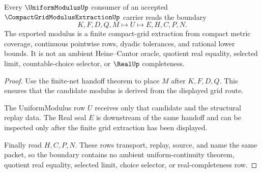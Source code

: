 \begin{theorem}
\label{thm:compact-grid-modulus-extraction-uniform-modulus-boundary}
Every $\UniformModulusUp$ consumer of an accepted $\CompactGridModulusExtractionUp$ carrier reads the boundary
$$
K,F,D,Q,M \longmapsto U \longmapsto E,H,C,P,N .
$$
The exported modulus is a finite compact-grid extraction from compact metric coverage, continuous pointwise rows, dyadic tolerances, and rational lower bounds. It is not an ambient Heine--Cantor oracle, quotient real equality, selected limit, countable-choice selector, or $\RealUp$ completeness.
\end{theorem}
\begin{proof}
Use the finite-net handoff theorem to place $M$ after $K,F,D,Q$. This ensures that the candidate modulus is derived from the displayed grid route.

The UniformModulus row $U$ receives only that candidate and the structural replay data. The Real seal $E$ is downstream of the same handoff and can be inspected only after the finite grid extraction has been displayed.

Finally read $H,C,P,N$. These rows transport, replay, source, and name the same packet, so the boundary contains no ambient uniform-continuity theorem, quotient real equality, selected limit, choice selector, or real-completeness row.
\end{proof}




